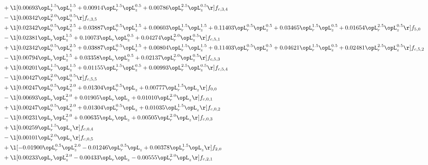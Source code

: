 \begin{alignat}{2}
& + \l[  0.00693 \opL_r^{1.5} \opL_z^{1.5} +  0.00914 \opL_r^{1.5} \opL_z^{0.5} +  0.00786 \opL_r^{2.5} \opL_z^{0.5}  \r] f_{c,3,4} \nonumber \\ 
& - \l[  0.00342 \opL_r^{2.0} \opL_z^{0.5}  \r] f_{c,3,5} \nonumber \\ 
& + \l[  0.02342 \opL_r^{0.5} \opL_z^{2.5} +  0.03887 \opL_r^{0.5} \opL_z^{1.5} +  0.00603 \opL_r^{1.5} \opL_z^{1.5} +  0.11403 \opL_r^{0.5} \opL_z^{0.5} +  0.03465 \opL_r^{1.5} \opL_z^{0.5} +  0.01654 \opL_r^{2.5} \opL_z^{0.5}  \r] f_{5,0} \nonumber \\ 
& - \l[  0.02381 \opL_r \opL_z^{1.5} +  0.10073 \opL_r \opL_z^{0.5} +  0.04274 \opL_r^{2.0} \opL_z^{0.5}  \r] f_{c,5,1} \nonumber \\ 
& + \l[  0.02342 \opL_r^{0.5} \opL_z^{2.5} +  0.03887 \opL_r^{0.5} \opL_z^{1.5} +  0.00804 \opL_r^{1.5} \opL_z^{1.5} +  0.11403 \opL_r^{0.5} \opL_z^{0.5} +  0.04621 \opL_r^{1.5} \opL_z^{0.5} +  0.02481 \opL_r^{2.5} \opL_z^{0.5}  \r] f_{c,5,2} \nonumber \\ 
& - \l[  0.00794 \opL_r \opL_z^{1.5} +  0.03358 \opL_r \opL_z^{0.5} +  0.02137 \opL_r^{2.0} \opL_z^{0.5}  \r] f_{c,5,3} \nonumber \\ 
& + \l[  0.00201 \opL_r^{1.5} \opL_z^{1.5} +  0.01155 \opL_r^{1.5} \opL_z^{0.5} +  0.00993 \opL_r^{2.5} \opL_z^{0.5}  \r] f_{c,5,4} \nonumber \\ 
& - \l[  0.00427 \opL_r^{2.0} \opL_z^{0.5}  \r] f_{c,5,5} \nonumber \\ 
& + \l[  0.00247 \opL_r^{0.5} \opL_z^{2.0} +  0.01304 \opL_r^{0.5} \opL_z +  0.00777 \opL_r^{1.5} \opL_z  \r] f_{0,0} \nonumber \\ 
& - \l[  0.00693 \opL_r \opL_z^{2.0} +  0.01905 \opL_r \opL_z +  0.01010 \opL_r^{2.0} \opL_z  \r] f_{c,0,1} \nonumber \\ 
& + \l[  0.00247 \opL_r^{0.5} \opL_z^{2.0} +  0.01304 \opL_r^{0.5} \opL_z +  0.01035 \opL_r^{1.5} \opL_z  \r] f_{c,0,2} \nonumber \\ 
& - \l[  0.00231 \opL_r \opL_z^{2.0} +  0.00635 \opL_r \opL_z +  0.00505 \opL_r^{2.0} \opL_z  \r] f_{c,0,3} \nonumber \\ 
& + \l[  0.00259 \opL_r^{1.5} \opL_z  \r] f_{c,0,4} \nonumber \\ 
& - \l[  0.00101 \opL_r^{2.0} \opL_z  \r] f_{c,0,5} \nonumber \\ 
& + \l[  -0.01900 \opL_r^{0.5} \opL_z^{2.0}   -0.01246 \opL_r^{0.5} \opL_z +  0.00378 \opL_r^{1.5} \opL_z  \r] f_{2,0} \nonumber \\ 
& + \l[  0.00233 \opL_r \opL_z^{2.0}   -0.00433 \opL_r \opL_z   -0.00555 \opL_r^{2.0} \opL_z  \r] f_{c,2,1} \nonumber \\ 

\end{alignat}
